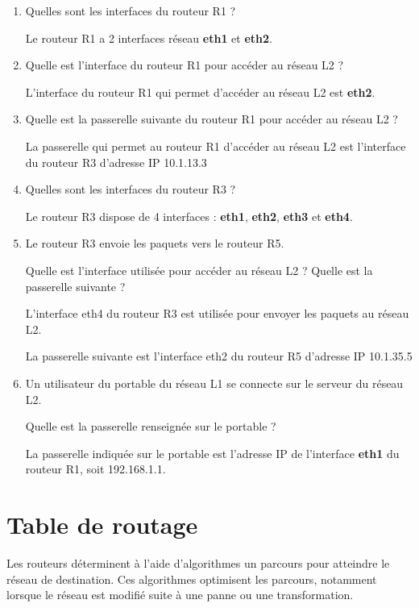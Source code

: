 \documentclass[11pt,a4paper]{article}
\begin{document}
\begin{enumerate}
\item Quelles sont les interfaces du routeur R1 ?

Le routeur R1 a 2 interfaces réseau \textbf{eth1} et \textbf{eth2}.
\vfill

\item Quelle est l'interface du routeur R1 pour accéder au réseau L2 ?

L'interface du routeur R1 qui permet d'accéder au réseau L2 est \textbf{eth2}.
\vfill

\item Quelle est la passerelle suivante du routeur R1 pour accéder au réseau L2 ?

La passerelle qui permet au routeur R1 d'accéder au réseau L2 est l'interface du routeur R3 d'adresse IP 10.1.13.3
\vfill

\item Quelles sont les interfaces du routeur R3 ?

Le routeur R3 dispose de 4 interfaces : \textbf{eth1}, \textbf{eth2}, \textbf{eth3} et \textbf{eth4}.
\vfill
\item Le routeur R3 envoie les paquets vers le routeur R5. 

Quelle est l'interface utilisée pour accéder au réseau L2 ? Quelle est la passerelle suivante ?

L'interface eth4 du routeur R3 est utilisée pour envoyer les paquets au réseau L2.

La passerelle suivante est l'interface eth2 du routeur R5 d'adresse IP 10.1.35.5
\vfill

\item Un utilisateur du portable du réseau L1 se connecte sur le serveur du réseau L2. 

Quelle est la passerelle renseignée sur le portable ?

La passerelle indiquée sur le portable est l'adresse IP de l'interface \textbf{eth1} du routeur R1, soit 192.168.1.1.
\vfill

\end{enumerate}

\newpage

\section*{Table de routage}

Les routeurs déterminent à l'aide d'algorithmes un parcours pour atteindre le réseau de destination. Ces algorithmes optimisent les parcours, notamment lorsque le réseau est modifié suite à une panne ou une transformation. 
\end{document}
